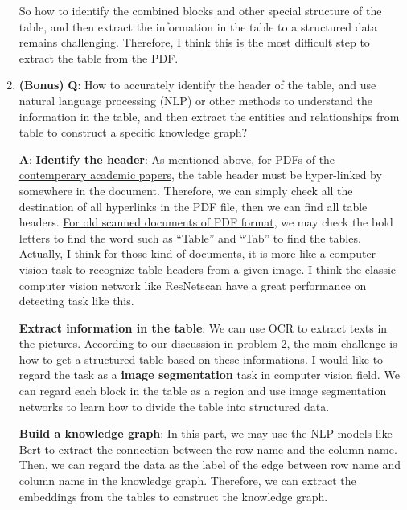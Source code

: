 \documentclass[12pt, a4paper]{article}
\theoremstyle{definition}
\begin{document}
\begin{enumerate}
	So how to identify the combined blocks and other special structure of the table, and then extract the information in the table to a structured data remains challenging. Therefore, I think this is the most difficult step to extract the table from the PDF.

	\item \textbf{(Bonus)} \textbf{Q}: How to accurately identify the header of the table, and use natural language processing (NLP) or other methods to understand the information in the table, and then extract the entities and relationships from table to construct a specific knowledge graph?
	
	\textbf{A}: 
	\textbf{Identify the header}: As mentioned above, \underline{for PDFs of the contemperary academic papers}, the table header must be hyper-linked by somewhere in the document. Therefore, we can simply check all the destination of all hyperlinks in the PDF file, then we can find all table headers. \underline{For old scanned documents of PDF format}, we may check the bold letters to find the word such as ``Table'' and ``Tab'' to find the tables. Actually, I think for those kind of documents, it is more like a computer vision task to recognize table headers from a given image. I think the classic computer vision network like ResNets\footnotemark[1] can have a great performance on detecting task like this.


	\textbf{Extract information in the table}: We can use OCR to extract texts in the pictures. According to our discussion in problem 2, the main challenge is how to get a structured table based on these informations. I would like to regard the task as a \textbf{image segmentation} task in computer vision field. We can regard each block in the table as a region and use image segmentation networks to learn how to divide the table into structured data.

	\textbf{Build a knowledge graph}: In this part, we may use the NLP models like Bert \footnotemark[2] to extract the connection between the row name and the column name. Then, we can regard the data as the label of the edge between row name and column name in the knowledge graph. Therefore, we can extract the embeddings from the tables to construct the knowledge graph.
\end{enumerate}
\end{document}
